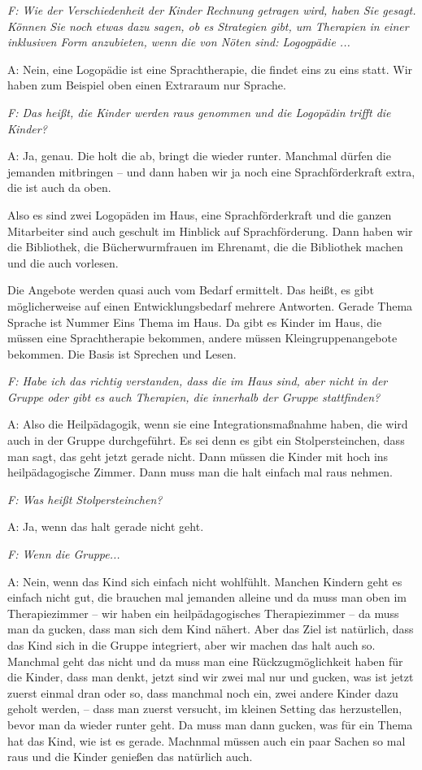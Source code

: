 \begin{linenumbers}
\emph{F: Wie der Verschiedenheit der Kinder Rechnung getragen wird, haben Sie gesagt. Können Sie noch etwas dazu sagen, ob es Strategien gibt, um Therapien in einer inklusiven Form anzubieten, wenn die von Nöten sind: Logogpädie ...}

A: Nein, eine Logopädie ist eine Sprachtherapie, die findet eins zu eins statt. Wir haben zum Beispiel oben einen Extraraum nur Sprache. 

\emph{F: Das heißt, die Kinder werden raus genommen und die Logopädin trifft die Kinder?}

A: Ja, genau. Die holt die ab, bringt die wieder runter. Manchmal dürfen die jemanden mitbringen -- und dann haben wir ja noch eine Sprachförderkraft extra, die ist auch da oben. 

Also es sind zwei Logopäden im Haus, eine Sprachförderkraft und die ganzen Mitarbeiter sind auch geschult im Hinblick auf Sprachförderung. Dann haben wir die Bibliothek, die Bücherwurmfrauen im Ehrenamt, die die Bibliothek machen und die auch vorlesen. 

Die Angebote werden quasi auch vom Bedarf ermittelt. Das heißt, es gibt möglicherweise auf einen Entwicklungsbedarf mehrere Antworten. Gerade Thema Sprache ist Nummer Eins Thema im Haus. Da gibt es Kinder im Haus, die müssen eine Sprachtherapie bekommen, andere müssen Kleingruppenangebote bekommen. Die Basis ist Sprechen und Lesen.

\emph{F: Habe ich das richtig verstanden, dass die im Haus sind, aber nicht in der Gruppe oder gibt es auch Therapien, die innerhalb der Gruppe stattfinden?} 

A: Also die Heilpädagogik, wenn sie eine Integrationsmaßnahme haben, die wird auch in der Gruppe durchgeführt. Es sei denn es gibt ein Stolpersteinchen, dass man sagt, das geht jetzt gerade nicht. Dann müssen die Kinder mit hoch ins heilpädagogische Zimmer. Dann muss man die halt einfach mal raus nehmen. 

\emph{F: Was heißt Stolpersteinchen?} 

A: Ja, wenn das halt gerade nicht geht. 

\emph{F: Wenn die Gruppe...}

A: Nein, wenn das Kind sich einfach nicht wohlfühlt. Manchen Kindern geht es einfach nicht gut, die brauchen mal jemanden alleine und da muss man oben im Therapiezimmer -- wir haben ein heilpädagogisches Therapiezimmer -- da muss man da gucken, dass man sich dem Kind nähert. Aber das Ziel ist natürlich, dass das Kind sich in die Gruppe integriert, aber wir machen das halt auch so. Manchmal geht das nicht und da muss man eine Rückzugmöglichkeit haben für die Kinder, dass man denkt, jetzt sind wir zwei mal nur und gucken, was ist jetzt zuerst einmal dran oder so, dass manchmal noch ein, zwei andere Kinder dazu geholt werden, -- dass man zuerst versucht, im kleinen Setting das herzustellen, bevor man da wieder runter geht. Da muss man dann gucken, was für ein Thema hat das Kind, wie ist es gerade. Machnmal müssen auch ein paar Sachen so mal raus und die Kinder genießen das natürlich auch. 


\end{linenumbers}

